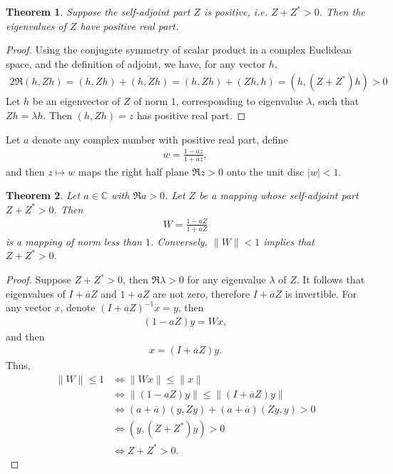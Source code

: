 \documentclass[11pt]{book}
\newtheorem{theorem}{Theorem}[section]
\theoremstyle{definition}
\numberwithin{equation}{chapter}
\begin{document}
\begin{theorem}
Suppose the self-adjoint part $Z$ is positive, i.e. $Z + Z^* > 0$. Then the eigenvalues of $Z$ have positive real part.
\end{theorem}
\begin{proof}
Using the conjugate symmetry of scalar product in a complex Euclidean space, and the definition of adjoint, we have, for any vector $h$,
\begin{align*}
    2 \Re (h, Zh) = (h, Zh) + \overline{(h, Zh)} = (h, Zh) + (Zh, h) = (h, (Z+Z^*)h) > 0
\end{align*}
Let $h$ be an eigenvector of $Z$ of norm $1$, corresponding to eigenvalue $\lambda$, such that $Zh = \lambda h$. Then $(h, Zh) = z$ has positive real part.
\end{proof}

\medskip

Let $a$ denote any complex number with positive real part, define
\begin{align*}
    w = \frac{1 - az}{1+\overline{a}z},
\end{align*}
and then $z \mapsto w$ maps the right half plane $\Re z > 0$ onto the unit disc $|w| < 1$. 

\medskip

\begin{theorem}
Let $a \in \mathbb{C}$ with $\Re a > 0$. Let $Z$ be a mapping whose self-adjoint part $Z + Z^* > 0$. Then
\begin{align*}
    W = \frac{1 - aZ}{1+\overline{a}Z}
\end{align*}
is a mapping of norm less than $1$. Conversely, $\|W\| < 1$ implies that $Z + Z^* > 0$.
\end{theorem}
\begin{proof}
Suppose $Z + Z^* > 0$, then $\Re \lambda > 0$ for any eigenvalue $\lambda$ of $Z$. It follows that eigenvalues of $I + \overline{a} Z$ and $1 + aZ$ are not zero, therefore $I + \overline{a} Z$ is invertible. For any vector $x$, denote $(I + \overline{a} Z)^{-1}x = y$, then \begin{align*}
    (1 - aZ)y = Wx,
\end{align*}
and then 
\begin{align*}
    x = (I + \overline{a} Z)y.
\end{align*}
Thus,
\begin{align*}
    \|W\| \leq 1 & \Leftrightarrow \|Wx\| \leq \|x\| \\
    & \Leftrightarrow \|(1 - aZ)y\| \leq \|(I + \overline{a} Z)y\| \\
    & \Leftrightarrow (a+\overline{a})(y,Zy) + (a+\overline{a})(Zy,y) > 0 \\
    & \Leftrightarrow (y, (Z+Z^*)y) > 0 \\
    & \Leftrightarrow Z+Z^* > 0.
\end{align*}
\end{proof}
\end{document}
